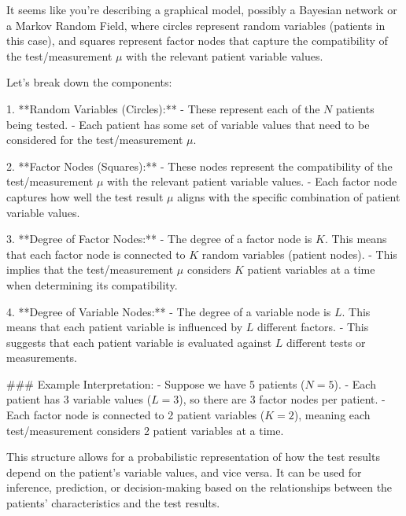 It seems like you're describing a graphical model, possibly a Bayesian network or a Markov Random Field, where circles represent random variables (patients in this case), and squares represent factor nodes that capture the compatibility of the test/measurement \(\mu\) with the relevant patient variable values.

Let's break down the components:

1. **Random Variables (Circles):**
   - These represent each of the \(N\) patients being tested.
   - Each patient has some set of variable values that need to be considered for the test/measurement \(\mu\).

2. **Factor Nodes (Squares):**
   - These nodes represent the compatibility of the test/measurement \(\mu\) with the relevant patient variable values.
   - Each factor node captures how well the test result \(\mu\) aligns with the specific combination of patient variable values.

3. **Degree of Factor Nodes:**
   - The degree of a factor node is \(K\). This means that each factor node is connected to \(K\) random variables (patient nodes).
   - This implies that the test/measurement \(\mu\) considers \(K\) patient variables at a time when determining its compatibility.

4. **Degree of Variable Nodes:**
   - The degree of a variable node is \(L\). This means that each patient variable is influenced by \(L\) different factors.
   - This suggests that each patient variable is evaluated against \(L\) different tests or measurements.

### Example Interpretation:
- Suppose we have 5 patients (\(N = 5\)).
- Each patient has 3 variable values (\(L = 3\)), so there are 3 factor nodes per patient.
- Each factor node is connected to 2 patient variables (\(K = 2\)), meaning each test/measurement considers 2 patient variables at a time.

This structure allows for a probabilistic representation of how the test results depend on the patient's variable values, and vice versa. It can be used for inference, prediction, or decision-making based on the relationships between the patients' characteristics and the test results.